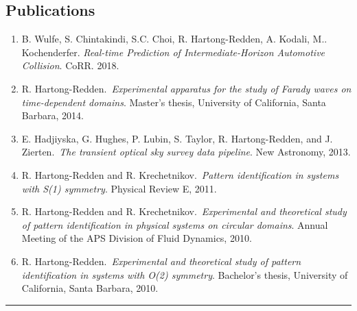\documentclass[10pt,letterpaper]{article}
\newenvironment{indentsection}[1]%
{\begin{list}{}%
	{\setlength{\leftmargin}{#1}}%
	\item[]%
}
{\end{list}}
\begin{document}
\subsection*{Publications}
\begin{indentsection}{\parindent}
\begin{enumerate}
	\item B. Wulfe, S. Chintakindi, S.C. Choi, R. Hartong-Redden,  A. Kodali, M.. Kochenderfer. \emph{Real-time Prediction of Intermediate-Horizon Automotive Collision}. CoRR. 2018.
	\item R. Hartong-Redden.~\emph{Experimental apparatus for the study of Farady waves on time-dependent domains}. Master's thesis, University of California, Santa Barbara, 2014.
	\item E. Hadjiyska, G. Hughes, P. Lubin, S. Taylor, R. Hartong-Redden, and J. Zierten.~\emph{The transient optical sky survey data pipeline}. New Astronomy, 2013.
	\item R. Hartong-Redden and R. Krechetnikov.~{\em Pattern identification in systems with S(1) symmetry}. Physical Review E, 2011.
	\item R. Hartong-Redden and R. Krechetnikov.~{\em Experimental and theoretical study of pattern identification in physical systems on circular domains}. Annual Meeting of the APS Division of Fluid Dynamics, 2010.
	\item R. Hartong-Redden.~{\em Experimental and theoretical study of pattern identification in systems with O(2) symmetry}. Bachelor's thesis, University of California, Santa Barbara, 2010.
\end{enumerate}
\end{indentsection}
\hrule
\end{document}
